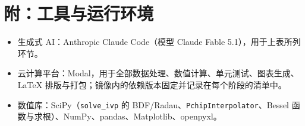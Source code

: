 \section*{附：工具与运行环境}
\begin{itemize}
  \item 生成式 AI：Anthropic Claude Code（模型 Claude Fable 5.1），用于上表所列环节。
  \item 云计算平台：Modal，用于全部数据处理、数值计算、单元测试、图表生成、\LaTeX{} 排版与打包；镜像内的依赖版本固定并记录在每个阶段的清单中。
  \item 数值库：SciPy（\texttt{solve\_ivp} 的 BDF/Radau、\texttt{PchipInterpolator}、Bessel 函数与求根）、NumPy、pandas、Matplotlib、openpyxl。
\end{itemize}
